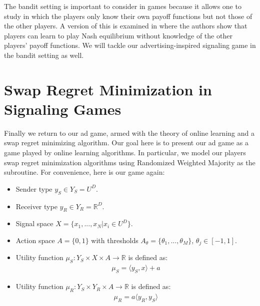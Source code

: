 \documentclass{article}
\begin{document}
The bandit setting is important to consider in games because it allows one to study in which the players only know their own payoff functions but not those of the other players. A version of this is examined in \cite{kalai1993rational} where the authors show that players can learn to play Nash equilibrium without knowledge of the other players' payoff functions. We will tackle our advertising-inspired signaling game in the bandit setting as well.

\section{Swap Regret Minimization in Signaling Games}

Finally we return to our ad game, armed with the theory of online learning and a swap regret minimizing algorithm. Our goal here is to present our ad game as a game played by online learning algorithms. In particular, we model our players swap regret minimization algorithms using Randomized Weighted Majority as the subroutine. For convenience, here is our game again:
\begin{itemize}
    \item Sender type $y_S \in Y_S = U^D$.
    \item Receiver type $y_R \in Y_R = \mathbb{R}^D $.
    \item Signal space $X = \lbrace x_1, ..., x_N \vert x_i \in U^D \rbrace$.
    \item Action space $A = \lbrace 0,1 \rbrace$ with thresholds $A_\theta = \lbrace \theta_1,...,\theta_M \rbrace$, $\theta_j \in [-1,1]$.
    \item Utility function $\mu_S: Y_S \times X \times A \rightarrow \mathbb{R}$ is defined as:
    \begin{align*}
        \mu_S = \langle y_S, x \rangle + a%
    \end{align*}
    \item Utility function $\mu_R: Y_S \times Y_R \times A \rightarrow \mathbb{R}$ is defined as:
    \begin{align*}
        \mu_R = a \langle y_R, y_S \rangle%
    \end{align*}
\end{itemize}
\end{document}
